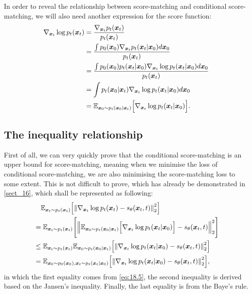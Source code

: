 In order to reveal the relationship between score-matching and conditional score-matching, we will also need another expression for the score function:
\begin{align}
    \nabla_{\bm{x}_{t}}\log p_t(\bm{x}_{t}) &= \frac{\nabla_{\bm{x}_{t}}p_t(\bm{x}_{t})}{p_t(\bm{x}_{t})} \label{eq:18.5}\\
    &=\frac{\int p_0 (\bm{x}_0)\nabla_{\bm{x}_{t}} p_t(\bm{x}_{t}|\bm{x}_0)d\bm{x}_0}{p_t(\bm{x}_{t})}\nonumber\\
    &=\frac{\int p_0(\bm{x}_0) p_t(\bm{x}_{t}|\bm{x}_0)\nabla_{\bm{x}_{t}}\log p_{t}(\bm{x}_{t}|\bm{x}_0)d\bm{x}_0}{p_t(\bm{x}_{t})}\nonumber\\
    &=\int p_t(\bm{x}_0|\bm{x}_t)\nabla_{\bm{x}_{t}}\log p_{t}(\bm{x}_{t}|\bm{x}_0)d\bm{x}_0\nonumber\\
    &=\mathbb{E}_{\bm{x}_0\sim p_t(\bm{x}_0|\bm{x}_t)}\Bigl[\nabla_{\bm{x}_{t}}\log p_{t}(\bm{x}_{t}|\bm{x}_0) \Bigr].\nonumber
\end{align}

\subsection{The inequality relationship}

First of all, we can very quickly prove that the conditional score-matching is an upper bound for score-matching, meaning when we minimise the loss of conditional score-matching, we are also minimising the score-matching loss to some extent. This is not difficult to prove, which has already be demonstrated in \cref{sect_16}, which shall be represented as following:
\begin{align}
    &\quad \mathbb{E}_{\bm{x}_{t}\sim p_t(\bm{x}_{t})}\Bigl[\left\| \nabla_{\bm{x}_{t}}\log p_{t}(\bm{x}_{t})-s_{\theta}(\bm{x}_{t},t) \right\|_2^2 \Bigr]\nonumber\\
    &=\mathbb{E}_{\bm{x}_{t}\sim p_t(\bm{x}_{t})} \Biggl[ \left\| \mathbb{E}_{\bm{x}_0\sim p_t (\bm{x}_0|\bm{x}_t)} \Bigl[\nabla_{\bm{x}_{t}}\log p_t(\bm{x}_{t}|\bm{x}_0) \Bigr]- s_{\theta}(\bm{x}_{t},t) \right\|_2^2 \Biggr]\nonumber\\
    &\leq \mathbb{E}_{\bm{x}_{t}\sim p_t(\bm{x}_{t})} \mathbb{E}_{\bm{x}_0\sim p_t (\bm{x}_0|\bm{x}_t)} \Bigl[\left\| \nabla_{\bm{x}_{t}}\log p_{t}(\bm{x}_{t}|\bm{x}_0)-s_{\theta}(\bm{x}_{t},t) \right\|_2^2 \Bigr]\label{eq:18.6}\\
    &=\mathbb{E}_{\bm{x}_0\sim p_0(\bm{x}_0),\bm{x}_{t}\sim p_t(\bm{x}_{t}|\bm{x}_0)} \Bigl[\left\| \nabla_{\bm{x}_{t}}\log p_{t}(\bm{x}_{t}|\bm{x}_0)-s_{\theta}(\bm{x}_{t},t) \right\|_2^2 \Bigr],\nonumber
\end{align}
in which the first equality comes from \cref{eq:18.5}, the second inequality is derived based on the Jansen's inequality. Finally, the last equality is from the Baye's rule.


